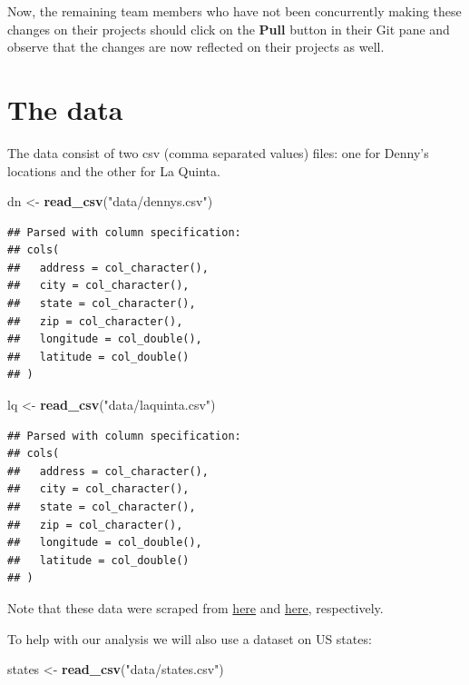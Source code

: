 \documentclass[]{book}
\newenvironment{Shaded}{\begin{snugshade}}{\end{snugshade}}
\newcommand{\KeywordTok}[1]{\textcolor[rgb]{0.13,0.29,0.53}{\textbf{#1}}}
\newcommand{\StringTok}[1]{\textcolor[rgb]{0.31,0.60,0.02}{#1}}
\newcommand{\NormalTok}[1]{#1}
\theoremstyle{definition}
\theoremstyle{definition}
\theoremstyle{definition}
\theoremstyle{remark}
\begin{document}
Now, the remaining team members who have not been concurrently making
these changes on their projects should click on the \textbf{Pull} button
in their Git pane and observe that the changes are now reflected on
their projects as well.

\chapter{The data}\label{the-data}

The data consist of two csv (comma separated values) files: one for
Denny's locations and the other for La Quinta.

\begin{Shaded}
\begin{Highlighting}[]
\NormalTok{dn <-}\StringTok{ }\KeywordTok{read_csv}\NormalTok{(}\StringTok{"data/dennys.csv"}\NormalTok{)}
\end{Highlighting}
\end{Shaded}

\begin{verbatim}
## Parsed with column specification:
## cols(
##   address = col_character(),
##   city = col_character(),
##   state = col_character(),
##   zip = col_character(),
##   longitude = col_double(),
##   latitude = col_double()
## )
\end{verbatim}

\begin{Shaded}
\begin{Highlighting}[]
\NormalTok{lq <-}\StringTok{ }\KeywordTok{read_csv}\NormalTok{(}\StringTok{"data/laquinta.csv"}\NormalTok{)}
\end{Highlighting}
\end{Shaded}

\begin{verbatim}
## Parsed with column specification:
## cols(
##   address = col_character(),
##   city = col_character(),
##   state = col_character(),
##   zip = col_character(),
##   longitude = col_double(),
##   latitude = col_double()
## )
\end{verbatim}

Note that these data were scraped from
\href{https://locations.dennys.com/}{here} and
\href{https://www.lq.com/en/findandbook/hotel-listings.html}{here},
respectively.

To help with our analysis we will also use a dataset on US states:

\begin{Shaded}
\begin{Highlighting}[]
\NormalTok{states <-}\StringTok{ }\KeywordTok{read_csv}\NormalTok{(}\StringTok{"data/states.csv"}\NormalTok{)}
\end{Highlighting}
\end{Shaded}
\end{document}
